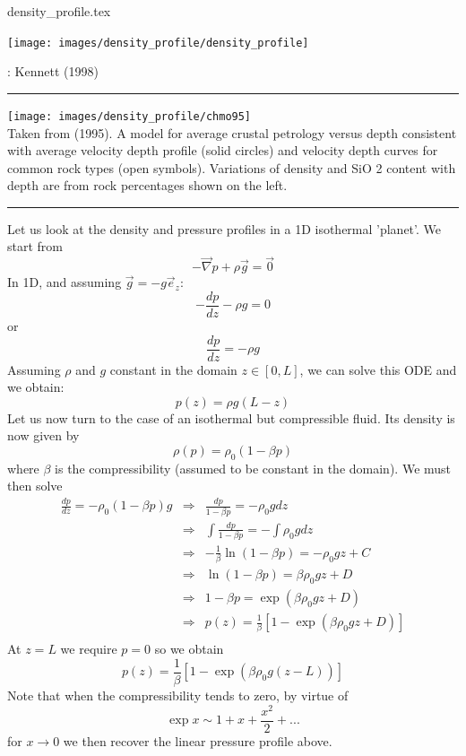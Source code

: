 \begin{flushright} {\tiny {\color{gray} density\_profile.tex}} \end{flushright}

\begin{center}
\texttt{[image: images/density\_profile/density\_profile]}
\end{center}

\Literature: Kennett (1998) \cite{kenn98}

\textcolor[RGB]{220,220,220}{\rule{\linewidth}{0.2pt}}

\begin{center}
\texttt{[image: images/density\_profile/chmo95]}\\
{\captionfont Taken from \textcite{chmo95} (1995).
A model for average crustal petrology versus depth consistent with average velocity depth
profile (solid circles) and velocity depth curves for common rock types (open symbols). 
Variations of density and SiO 2 content with depth are from rock percentages
shown on the left.} 
\end{center}


\textcolor[RGB]{220,220,220}{\rule{\linewidth}{0.2pt}}

Let us look at the density and pressure profiles in a 1D isothermal 'planet'. 
We start from 
\[
-\vec\nabla p + \rho \vec{g} = \vec{0}
\]
In 1D, and assuming $\vec{g}=-g \vec{e}_z$:
\[
-\frac{dp}{dz}-\rho g=0
\]
or
\[
\frac{dp}{dz}= -\rho g
\]
Assuming $\rho$ and $g$ constant in the domain $z\in [0,L]$, we can solve this ODE and we obtain:
\[
p(z) = \rho g (L-z)
\]
Let us now turn to the case of an isothermal but compressible fluid. 
Its density is now given by 
\[
\rho(p) = \rho_0(1-\beta p)
\]
where $\beta$ is the compressibility (assumed to be constant in the domain). We must then solve
\begin{eqnarray}
\frac{dp}{dz}= -\rho_0(1-\beta p) g
&\Rightarrow&
\frac{dp}{1-\beta p} = -\rho_0 g dz \nonumber\\
&\Rightarrow&
\int \frac{dp}{1-\beta p} = -\int \rho_0 g dz \nonumber\\
&\Rightarrow&
-\frac{1}{\beta} \ln (1-\beta p) = -\rho_0 g z + C \nonumber\\
&\Rightarrow&
\ln (1-\beta p) = \beta \rho_0 g z + D \nonumber\\
&\Rightarrow&
1 -\beta p = \exp \left( \beta \rho_0 g z + D  \right) \nonumber\\
&\Rightarrow&
p(z) = \frac{1}{\beta} \left[ 1- \exp \left( \beta \rho_0 g z + D  \right) \right] \nonumber\\
\end{eqnarray}
At $z=L$ we require $p=0$ so we obtain
\[
p(z) = \frac{1}{\beta} \left[ 1- \exp \left( \beta \rho_0 g (z-L)  \right) \right]
\]
Note that when the compressibility tends to zero, by virtue of 
\[
\exp x \sim 1 + x + \frac{x^2}{2} + ...
\]
for $x\rightarrow 0$ we then recover the linear pressure profile above.

